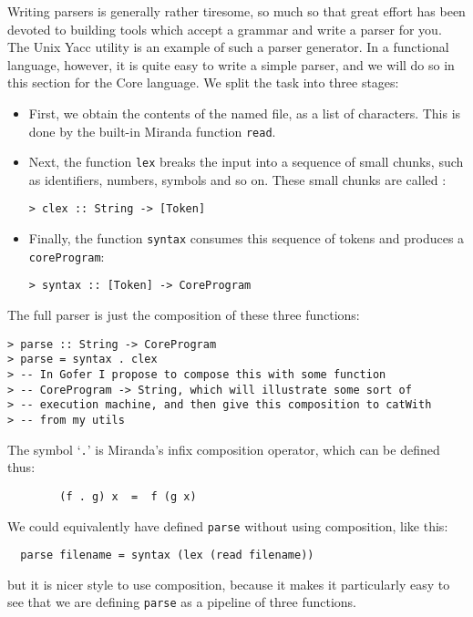Writing parsers is generally rather tiresome, so much so that great
effort has been devoted to building tools which accept a grammar and
write a parser for you.  The Unix Yacc utility
is an example of such a parser generator.
In a functional language, however, it is quite easy
to write a simple parser,
and we will do so in this section for the Core language.
We split the task into three stages:
\begin{itemize}
\item
First, we obtain the contents of the named file, as a list of characters.
This is done by the built-in Miranda function \mbox{\tt read}.

\item
Next, the  function \mbox{\tt lex} breaks the input into
a sequence of small chunks, such as identifiers, numbers, symbols and so on.
These small chunks are called :
\begin{verbatim}
> clex :: String -> [Token]
\end{verbatim}
%
\item
Finally, the  function \mbox{\tt syntax} consumes this
sequence of tokens and produces a \mbox{\tt coreProgram}:
\begin{verbatim}
> syntax :: [Token] -> CoreProgram
\end{verbatim}
%
\end{itemize}
The full parser is just the composition of these three functions:
\begin{verbatim}
> parse :: String -> CoreProgram
> parse = syntax . clex
> -- In Gofer I propose to compose this with some function
> -- CoreProgram -> String, which will illustrate some sort of
> -- execution machine, and then give this composition to catWith
> -- from my utils
\end{verbatim}
%
%
The symbol `\mbox{\tt .}' is Miranda's infix
composition operator, which can be defined thus:
\begin{verbatim}
        (f . g) x  =  f (g x)
\end{verbatim}
We could equivalently have defined \mbox{\tt parse} without using composition, like this:
\begin{verbatim}
  parse filename = syntax (lex (read filename))
\end{verbatim}
but it is nicer style to use composition, because it makes it
particularly easy to
see that we are defining \mbox{\tt parse} as a pipeline of three functions.

